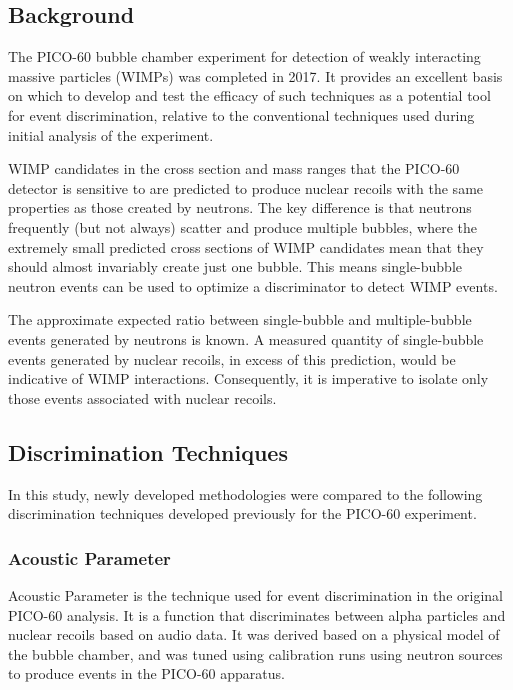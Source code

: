 \documentclass[10pt]{article}
\begin{document}
\subsection{Background}

The PICO-60 bubble chamber experiment for detection of weakly interacting massive particles (WIMPs) was completed in 2017. It provides an excellent basis on which to develop and test the efficacy of such techniques as a potential tool for event discrimination, relative to the conventional techniques used during initial analysis of the experiment.

WIMP candidates in the cross section and mass ranges that the PICO-60 detector is sensitive to are predicted to produce nuclear recoils with the same properties as those created by neutrons. The key difference is that neutrons frequently (but not always) scatter and produce multiple bubbles, where the extremely small predicted cross sections of WIMP candidates mean that they should almost invariably create just one bubble. This means single-bubble neutron events can be used to optimize a discriminator to detect WIMP events.

The approximate expected ratio between single-bubble and multiple-bubble events generated by neutrons is known. A measured quantity of single-bubble events generated by nuclear recoils, in excess of this prediction, would be indicative of WIMP interactions. Consequently, it is imperative to isolate only those events associated with nuclear recoils.

\subsection{Discrimination Techniques}

In this study, newly developed methodologies were compared to the following discrimination techniques developed previously for the PICO-60 experiment.

\subsubsection{Acoustic Parameter}

Acoustic Parameter is the technique used for event discrimination in the original PICO-60 analysis. It is a function that discriminates between alpha particles and nuclear recoils based on audio data. It was derived based on a physical model of the bubble chamber, and was tuned using calibration runs using neutron sources to produce events in the PICO-60 apparatus.
\end{document}
